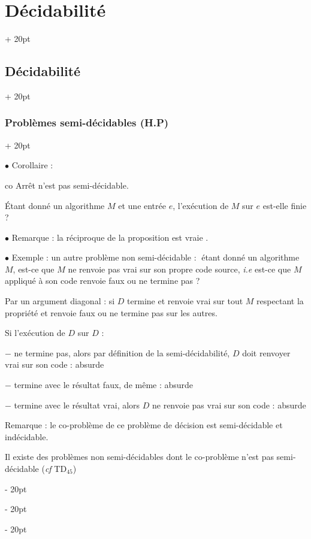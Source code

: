 \documentclass[a4paper, 12pt, twoside]{article}
\newcommand{\simplecit}[1]{\guillemotleft$\;$#1$\;$\guillemotright}
\newcommand{\ind}[1][20pt]{\advance\leftskip + #1}
\newcommand{\deind}[1][20pt]{\advance\leftskip - #1}
\newenvironment{indt}[2][20pt]{#2 \par \ind[#1]}{\par \deind} %
\begin{document}
\begin{indt}{\section{Décidabilité}}
\begin{indt}{\subsection{Décidabilité}}
\begin{indt}{\subsubsection{Problèmes semi-décidables (H.P)}}
                \vspace{12pt}
                
                $\bullet$ Corollaire :
                \begin{emphBox}
                    co Arrêt n'est pas semi-décidable.
                \end{emphBox}

                \'Etant donné un algorithme $M$ et une entrée $e$, l'exécution de $M$ sur $e$ est-elle finie ?

                \vspace{12pt}
                
                $\bullet$ Remarque : la réciproque de la proposition est vraie .

                \vspace{12pt}
                
                $\bullet$ Exemple : un autre problème non semi-décidable : \simplecit{étant donné un algorithme $M$, est-ce que $M$ ne renvoie pas vrai sur son propre code source, \textit{i.e} est-ce que $M$ appliqué à son code renvoie faux ou ne termine pas ?}

                Par un argument diagonal : si $D$ termine et renvoie vrai sur tout $M$ respectant la propriété et renvoie faux ou ne termine pas sur les autres.

                Si l'exécution de $D$ sur $D$ :

                $-$ ne termine pas, alors par définition de la semi-décidabilité, $D$ doit renvoyer vrai sur son code : absurde

                $-$ termine avec le résultat faux, de même : absurde

                $-$ termine avec le résultat vrai, alors $D$ ne renvoie pas vrai sur son code : absurde

                \vspace{21pt}
                
                Remarque : le co-problème de ce problème de décision est semi-décidable et indécidable.

                Il existe des problèmes  non semi-décidables dont le co-problème n'est pas semi-décidable (\textit{cf} TD$_{45}$)
            \end{indt}
        \end{indt}

        \vspace{12pt}
        

\end{indt}
\end{document}
